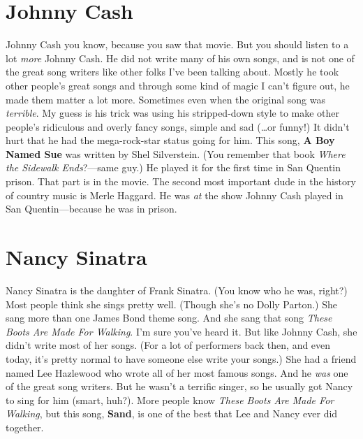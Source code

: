 \documentclass[letterpaper,single]{article}
\begin{document}
\section{Johnny Cash}
Johnny Cash you know, because you saw that movie.
But you should listen to a lot \emph{more} Johnny Cash. 
He did not write many of his own songs, and is not one of the great song writers like other folks I've been talking about. 
Mostly he took other people's great songs and through some kind of magic I can't figure out, he made them matter a lot more.
Sometimes even when the original song was \emph{terrible}. 
My guess is his trick was using his stripped-down style to make other people's ridiculous and overly fancy songs, simple and sad (\ldots or funny!)
It didn't hurt that he had the mega-rock-star status going for him.
This song, \textbf{A Boy Named Sue} was written by Shel Silverstein. 
(You remember that book \emph{Where the Sidewalk Ends}?---same guy.) 
He played it for the first time in San Quentin prison. 
That part is in the movie.
The second most important dude in the history of country music is Merle Haggard. He was \emph{at} the show Johnny Cash played in San Quentin---because he was in prison.

\section{Nancy Sinatra}
Nancy Sinatra is the daughter of Frank Sinatra. (You know who he was, right?) 
Most people think she sings pretty well. (Though she's no Dolly Parton.)
She sang more than one James Bond theme song. 
And she sang that song \emph{These Boots Are Made For Walking}. 
I'm sure you've heard it. 
But like Johnny Cash, she didn't write most of her songs. 
(For a lot of performers back then, and even today, it's pretty normal to have someone else write your songs.)
She had a friend named Lee Hazlewood who wrote all of her most famous songs. 
And he \emph{was} one of the great song writers. 
But he wasn't a terrific singer, so he usually got Nancy to sing for him (smart, huh?). 
More people know \emph{These Boots Are Made For Walking}, but this song, \textbf{Sand}, is one of the best that Lee and Nancy ever did together.
\end{document}
